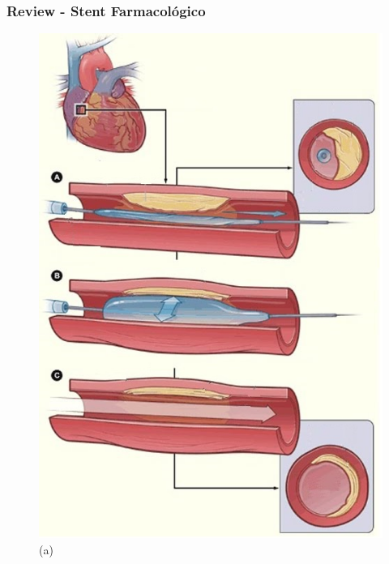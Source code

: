 
\begin{frame} 
\frametitle{Review - Stent Farmacológico}
  \vspace{-0.85cm}
\begin{figure}[H]
     \begin{minipage}{.50\linewidth}
      \centering
      \includegraphics[scale=0.3]{images/balloon.jpg}\\
      \scriptsize (a)
     \end{minipage}%
     \begin{minipage}{.50\linewidth}
      \centering

\end{minipage}
\end{figure}
\end{frame}
